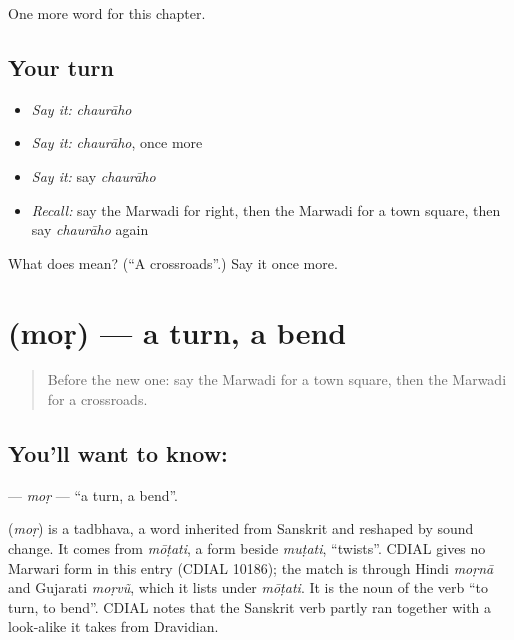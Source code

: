 \begin{grammarlens}[title={What you've built}]
One more word for this chapter.
\end{grammarlens}

\subsection*{Your turn}
\begin{itemize}
\raggedright
  \item \emph{Say it:} \emph{chaurāho}
  \item \emph{Say it:} \emph{chaurāho}, once more
  \item \emph{Say it:} say \emph{chaurāho}
  \item \emph{Recall:} say the Marwadi for right, then the Marwadi for a town square, then say \emph{chaurāho} again
\end{itemize}

\begin{tcolorbox}[breakable,colback=teal!4,colframe=teal!35!black,title={Before you move on}]
What does  mean? (\textquotedblleft{}A crossroads\textquotedblright{}.) Say it once more.
\end{tcolorbox}
\section[\texorpdfstring{\mw{मोड़} (moṛ)}{मोड़ (moṛ)}]{ (moṛ) — a turn, a bend}

\label{lesson:MW-C98-mor}



\begin{quote}
Before the new one: say the Marwadi for a town square, then the Marwadi for a crossroads.
\end{quote}

\subsection*{You'll want to know: }
\textbf{} — \emph{moṛ} — \textquotedblleft{}a turn, a bend\textquotedblright{}.

\begin{cousinweb}
\textbf{} (\emph{moṛ}) is a tadbhava, a word inherited from Sanskrit and reshaped by sound change. It comes from \emph{mōṭati}, a form beside \emph{muṭati}, \textquotedblleft{}twists\textquotedblright{}. CDIAL gives no Marwari form in this entry (CDIAL 10186); the match is through Hindi \emph{moṛnā} and Gujarati \emph{moṛvũ}, which it lists under \emph{mōṭati}. It is the noun of the verb \textquotedblleft{}to turn, to bend\textquotedblright{}. CDIAL notes that the Sanskrit verb partly ran together with a look-alike it takes from Dravidian.
\end{cousinweb}

